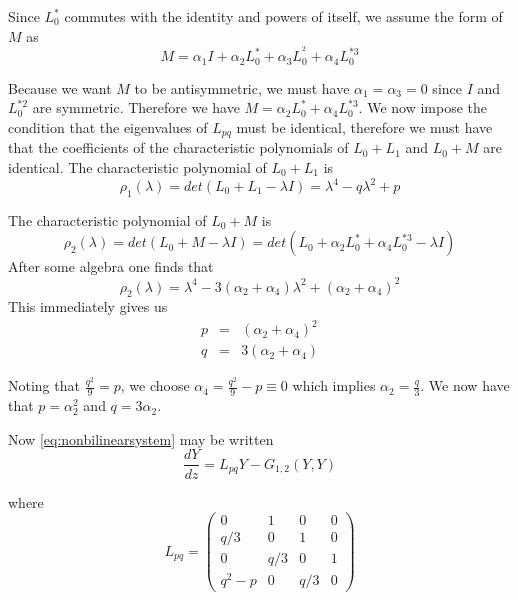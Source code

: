 Since $L_0^*$ commutes with the identity and powers of itself, we assume the form of $M$ as
\begin{equation}
M = \alpha_1 I + \alpha_2 L_0^* + \alpha_3 L_0^{^2} + \alpha_4 L_0^{*3}
\end{equation}

Because we want $M$ to be antisymmetric, we must have $\alpha_1=\alpha_3=0$ since $I$ and $L_0^{*2}$ are symmetric.
Therefore we have $ M = \alpha_2 L_0^* + \alpha_4 L_0^{*3} $. We now impose the condition that the eigenvalues of $L_{pq}$
must be identical, therefore we must have that the coefficients of the characteristic polynomials of $L_0 + L_1$ and $L_0 + M $
are identical.
The characteristic polynomial of $L_0+L_1$ is 
\begin{equation}
\rho_1(\lambda) = det\left( L_0 + L_1 - \lambda I \right) = \lambda^4 - q \lambda^2 + p
\end{equation}


The characteristic polynomial of $L_0+M$ is 
\begin{equation}
\rho_2(\lambda) = det\left( L_0 + M - \lambda I \right) = det \left(L_0 + \alpha_2 L_0^* + \alpha_4 L_0^{*3} - \lambda I \right)
\end{equation}
After some algebra one finds that 
\begin{equation}
\rho_2(\lambda) = \lambda^4 - 3\left(\alpha_2+\alpha_4\right) \lambda^2 + \left(\alpha_2+\alpha_4\right)^2
\end{equation}
This immediately gives us
\begin{subequations}
\begin{eqnarray}
p &=& \left(\alpha_2+\alpha_4\right)^2\\
q &=& 3 \left(\alpha_2 + \alpha_4\right)
\end{eqnarray}
\end{subequations}


Noting that $\frac{q^2}{9} = p $, we choose $\alpha_4 = \frac{q^2}{9} - p \equiv 0 $ which implies $\alpha_2 = \frac{q}{3} $. We 
now have that $p=\alpha_2^2$ and $q=3\alpha_2$.

Now \eqref{eq:nonbilinearsystem} may be written 
\begin{equation}\label{eq:bilinear}
\frac{ dY }{ dz } = L_{pq} Y - G_{1,2}(Y,Y)
\end{equation}

where 
\begin{equation}
L_{pq} = \left( 
\begin{array}{cccc}
0&1&0&0\\
q/3&0&1&0\\
0&q/3&0&1\\
q^2 - p &0&q/3&0 \end{array} \right)
 \end{equation}


